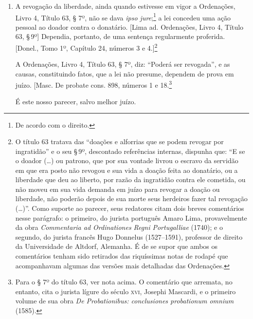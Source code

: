 \begin{enumerate}[label=Ao \arabic*º:]
\item A revogação da liberdade, ainda quando estivesse em vigor a
Ordenações, Livro 4, Título 63, § 7º, não se dava
\emph{ipso jure};\footnote{De acordo com o direito.} a lei concedeu
uma ação pessoal ao doador contra o donatário. {[}Lima ad.
Ordenações, Livro 4, Título 63, §\,9º{]} Dependia,
portanto, de uma sentença regularmente proferida. {[}Donel., Tomo 1º, %
Capítulo 24, números 3 e 4.{]}\footnote{O título 63 tratava
  das ``doações e alforrias que se podem revogar por ingratidão'' e o seu
  §\,9º, descontado referências internas, dispunha que: ``E se o doador
  (\ldots{}) ou patrono, que por sua vontade livrou o escravo da servidão em
  que era posto não revogou e sua vida a doação feita ao donatário, ou a
  liberdade que deu ao liberto, por razão da ingratidão contra ele
  cometida, ou não moveu em sua vida demanda em juízo para revogar a
  doação ou liberdade, não poderão depois de sua morte seus herdeiros
  fazer tal revogação (\ldots{})''. Como suporte ao parecer, seus redatores
  citam dois breves comentários nesse parágrafo: o primeiro, do jurista
  português Amaro Lima, provavelmente da obra \textit{Commentaria ad
    Ordinationes Regni Portugalliae} (1740); e o segundo, do jurista
  francês Hugo Donnelus (1527--1591), professor de direito da
  Universidade de Altdorf, Alemanha. É de se supor que ambos os
  comentários tenham sido retirados das riquíssimas notas de rodapé que
  acompanhavam algumas das versões mais detalhadas das Ordenações.}

A Ordenações, Livro 4, Título 63, § 7º, diz: ``Poderá
ser revogada'', e as causas, constituindo fatos, que a lei não presume,
dependem de prova em juízo. {[}Masc. De probate cons. 898, números
1 e 18.\footnote{Para o § 7º do título 63, ver nota acima. O
  comentário que arremata, no entanto, cita o jurista lígure do século
  \textsc{xvi}, Josephi Mascardi, e o primeiro volume de sua obra \emph{De
  Probationibus: conclusiones probationum omnium} (1585).}

É este nosso parecer, salvo melhor juízo.
\end{enumerate}

